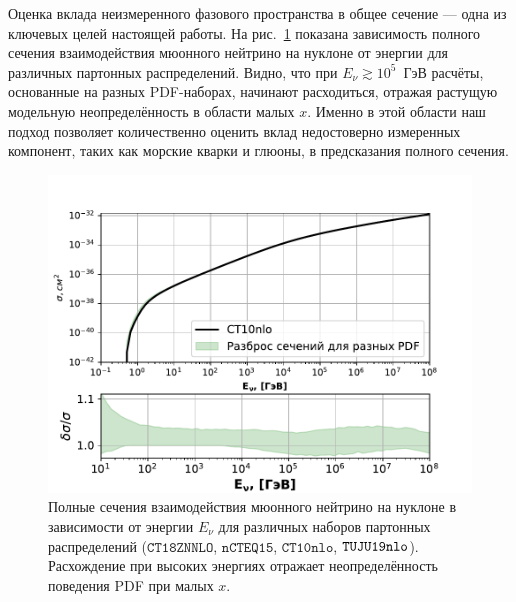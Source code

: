 Оценка вклада неизмеренного фазового пространства в общее сечение — одна из ключевых целей настоящей работы. На рис.~\ref{fig:xsec_total} показана зависимость полного сечения взаимодействия мюонного нейтрино на нуклоне от энергии для различных партонных распределений. Видно, что при $E_\nu \gtrsim 10^5$~ГэВ расчёты, основанные на разных PDF-наборах, начинают расходиться, отражая растущую модельную неопределённость в области малых $x$. Именно в этой области наш подход позволяет количественно оценить вклад недостоверно измеренных компонент, таких как морские кварки и глюоны, в предсказания полного сечения.


\begin{figure}[!h]
\centering
\includegraphics[width=\linewidth]{images/NuProp/xs_vs_enu.pdf}
\caption{Полные сечения взаимодействия мюонного нейтрино на нуклоне в зависимости от энергии $E_\nu$ для различных наборов партонных распределений ($\texttt{CT18ZNNLO}$, $\texttt{nCTEQ15}$, $\texttt{CT10nlo}$, $\texttt{TUJU19}\-\texttt{nlo}$). Расхождение при высоких энергиях отражает неопределённость поведения PDF при малых $x$.} 
\label{fig:xsec_total}
\end{figure}
